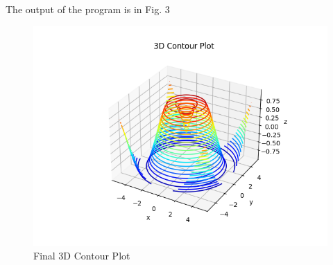 \documentclass[
11pt, %
a4paper, %
oneside, %
headinclude,footinclude, %
BCOR5mm, %
]{scrartcl}
\begin{document}
The output of the program is in Fig. 3

\begin{figure}[H]
	\centering %
	\includegraphics[width=0.4\columnwidth]{Figures/Figure3.png} 
	\caption[Final 3D Contour Plot]{Final 3D Contour Plot} %
	\label{fig:gallery} 
\end{figure}
\renewcommand{\refname}{\spacedlowsmallcaps{References}} %
\raggedright



\end{document}
